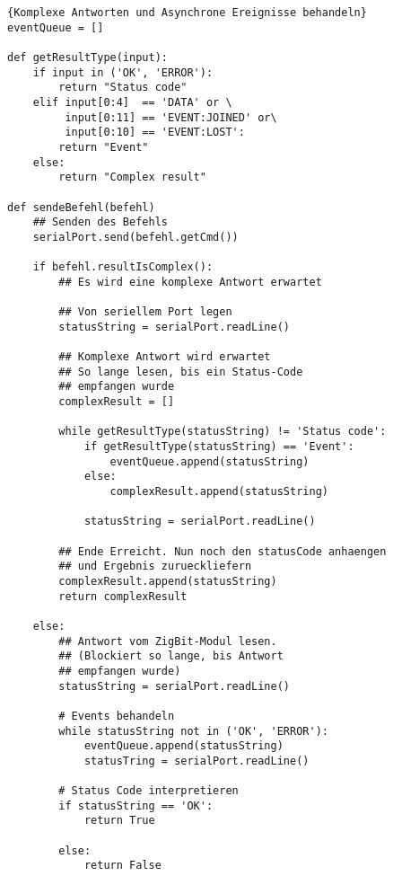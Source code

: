             \begin{lstlisting}{Komplexe Antworten und Asynchrone Ereignisse behandeln}
eventQueue = []

def getResultType(input):
    if input in ('OK', 'ERROR'):
        return "Status code"
    elif input[0:4]  == 'DATA' or \
         input[0:11] == 'EVENT:JOINED' or\ 
         input[0:10] == 'EVENT:LOST':
        return "Event"
    else:
        return "Complex result"

def sendeBefehl(befehl)
    ## Senden des Befehls
    serialPort.send(befehl.getCmd())

    if befehl.resultIsComplex():
        ## Es wird eine komplexe Antwort erwartet

        ## Von seriellem Port legen
        statusString = serialPort.readLine()

        ## Komplexe Antwort wird erwartet
        ## So lange lesen, bis ein Status-Code 
        ## empfangen wurde
        complexResult = []
        
        while getResultType(statusString) != 'Status code':
            if getResultType(statusString) == 'Event':
                eventQueue.append(statusString)
            else:
                complexResult.append(statusString)

            statusString = serialPort.readLine()

        ## Ende Erreicht. Nun noch den statusCode anhaengen
        ## und Ergebnis zurueckliefern
        complexResult.append(statusString)
        return complexResult

    else:
        ## Antwort vom ZigBit-Modul lesen.
        ## (Blockiert so lange, bis Antwort
        ## empfangen wurde)
        statusString = serialPort.readLine()

        # Events behandeln 
        while statusString not in ('OK', 'ERROR'):
            eventQueue.append(statusString)
            statusTring = serialPort.readLine()

        # Status Code interpretieren
        if statusString == 'OK':
            return True
        
        else:
            return False

            \end{lstlisting}


